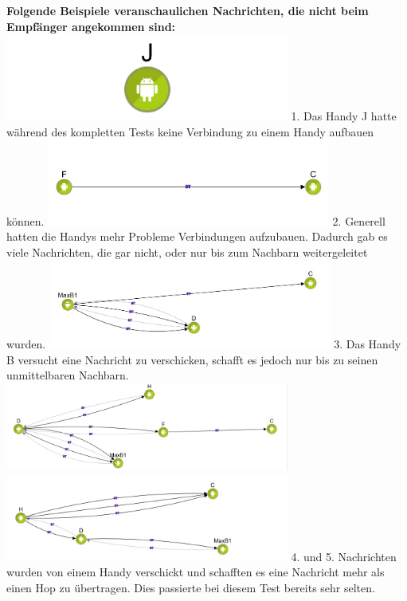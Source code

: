 \textbf{Folgende Beispiele veranschaulichen Nachrichten, die nicht beim
Empfänger angekommen sind:}
\includegraphics[width=0.7\textwidth]{belege/grosstests/Bilder/Test2Misserfolg1.jpg} 1. Das
Handy J hatte während des kompletten Tests keine Verbindung zu einem
Handy aufbauen können.
\includegraphics[width=0.7\textwidth]{belege/grosstests/Bilder/Test2Misserfolg3.jpg} 2.
Generell hatten die Handys mehr Probleme Verbindungen aufzubauen.
Dadurch gab es viele Nachrichten, die gar nicht, oder nur bis zum
Nachbarn weitergeleitet wurden.
\includegraphics[width=0.7\textwidth]{belege/grosstests/Bilder/Test2Misserfolg4.jpg} 3. Das
Handy B versucht eine Nachricht zu verschicken, schafft es jedoch nur
bis zu seinen unmittelbaren Nachbarn.
\includegraphics[width=0.7\textwidth]{belege/grosstests/Bilder/Test2Misserfolg5.jpg}
\includegraphics[width=0.7\textwidth]{belege/grosstests/Bilder/Test2Misserfolg6.jpg} 4. und
5. Nachrichten wurden von einem Handy verschickt und schafften es eine
Nachricht mehr als einen Hop zu übertragen. Dies passierte bei diesem
Test bereits sehr selten.


